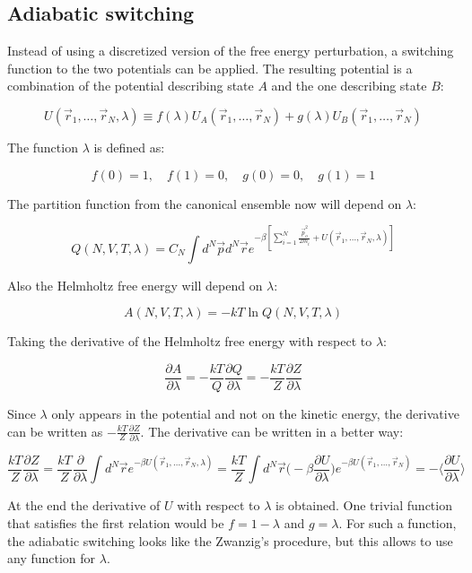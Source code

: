 	\subsection{Adiabatic switching}
	Instead of using a discretized version of the free energy perturbation, a switching function to the two potentials can be applied.
	The resulting potential is a combination of the potential describing state $A$ and the one describing state $B$:

	$$U(\vec{r}_1, \dots, \vec{r}_N, \lambda) \equiv f(\lambda)U_A(\vec{r}_1, \dots, \vec{r}_N)+g(\lambda)U_B(\vec{r}_1, \dots, \vec{r}_N)$$

	The function $\lambda$ is defined as:

	$$f(0) = 1, \quad f(1) = 0,\quad g(0) = 0, \quad g(1) = 1$$

	The partition function from the canonical ensemble now will depend on $\lambda$:

	$$Q(N, V, T, \lambda) = C_N\int d^N\vec{p}d^N\vec{r}e^{-\beta\left[\sum\limits_{i=1}^N\frac{\vec{p}_o^2}{2m_i}+U(\vec{r}_1, \dots, \vec{r}_N, \lambda)\right]}$$

	Also the Helmholtz free energy will depend on $\lambda$:

	$$A(N, V, T, \lambda) = -kT\ln Q(N, V, T, \lambda)$$

	Taking the derivative of the Helmholtz free energy with respect to $\lambda$:

	$$\frac{\partial A}{\partial \lambda} = -\frac{kT}{Q}\frac{\partial Q}{\partial \lambda} = -\frac{kT}{Z}\frac{\partial Z}{\partial\lambda}$$

	Since $\lambda$ only appears in the potential and not on the kinetic energy, the derivative can be written as $-\frac{kT}{Z}\frac{\partial Z}{\partial\lambda}$.
	The derivative can be written in a better way:

	$$\frac{kT}{Z}\frac{\partial Z}{\partial \lambda} = \frac{kT}{Z}\frac{\partial}{\partial\lambda}\int d^N\vec{r}e^{-\beta U(\vec{r}_1, \dots, \vec{r}_N, \lambda)} = \frac{kT}{Z}\int d^{N}\vec{r}\biggl(-\beta\frac{\partial U}{\partial\lambda}\biggr)e^{-\beta U(\vec{r}_1, \dots, \vec{r}_N)} = -\biggl\langle\frac{\partial U}{\partial\lambda}\biggr\rangle$$

	At the end the derivative of $U$ with respect to $\lambda$ is obtained.
	One trivial function that satisfies the first relation would be $f = 1-\lambda$ and $g = \lambda$.
	For such a function, the adiabatic switching looks like the Zwanzig's procedure, but this allows to use any function for $\lambda$.

